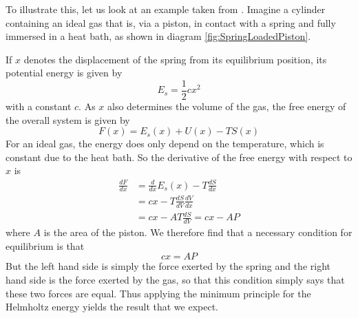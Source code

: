 \documentclass[a4paper, draft]{article}
\theoremstyle{own}
\theoremstyle{remark}
\begin{document}
To illustrate this, let us look at an example taken from \cite{Schwartz}. Imagine a cylinder containing an ideal gas that is, via a piston, in contact with a spring and fully immersed in a heat bath, as shown in diagram \ref{fig:SpringLoadedPiston}.

If $x$ denotes the displacement of the spring from its equilibrium position, its potential energy is given by
$$
E_s = \frac{1}{2} c x^2
$$
with a constant $c$. As $x$ also determines the volume of the gas, the free energy of the overall system is given by 
$$
F(x) = E_s(x) + U(x) - TS(x)
$$ 
For an ideal gas, the energy does only depend on the temperature, which is constant due to the heat bath. So the derivative of the free energy with respect to $x$ is
\begin{align*}
\frac{dF}{dx} &= \frac{d}{dx} E_s(x) - T \frac{dS}{dx} \\
&= c x - T \frac{dS}{dV} \frac{dV}{dx} \\
&= c x - A T \frac{dS}{dV} = cx - A P
\end{align*}
where $A$ is the area of the piston. We therefore find that a necessary condition for equilibrium is that
$$
cx =  A P
$$
But the left hand side is simply the force exerted by the spring and the right hand side is the force exerted by the gas, so that this condition simply says that these two forces are equal. Thus applying the minimum principle for the Helmholtz energy yields the result that we expect.
\end{document}
